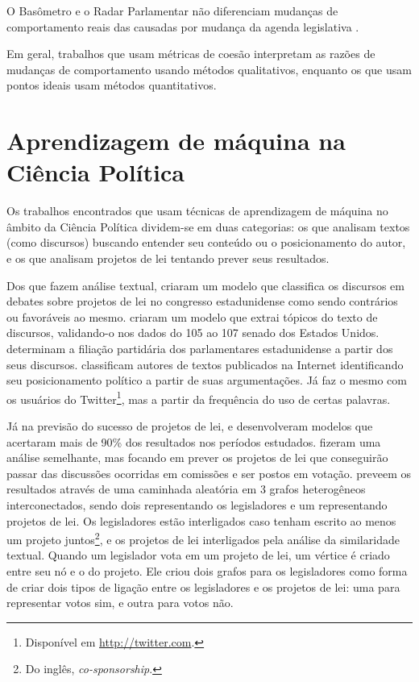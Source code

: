 O Basômetro e o Radar Parlamentar não diferenciam mudanças de comportamento
reais das causadas por mudança da agenda legislativa
\cite{Estadao2012,Trento2013}.

Em geral, trabalhos que usam métricas de coesão interpretam as razões de
mudanças de comportamento usando métodos qualitativos, enquanto os que usam
pontos ideais usam métodos quantitativos.

\section{Aprendizagem de máquina na Ciência Política}
\label{ref:trabalhos-relacionados:data-science-polsci}

Os trabalhos encontrados que usam técnicas de aprendizagem de máquina no
âmbito da Ciência Política dividem-se em duas categorias: os que analisam
textos (como discursos) buscando entender seu conteúdo ou o posicionamento do
autor, e os que analisam projetos de lei tentando prever seus resultados.

Dos que fazem análise textual,  criaram um modelo que
classifica os discursos em debates sobre projetos de lei no congresso
estadunidense como sendo contrários ou favoráveis ao mesmo.
 criaram um modelo que extrai tópicos do texto de
discursos, validando-o nos dados do 105\textordmasculine{} ao
107\textordmasculine{} senado dos Estados Unidos. 
determinam a filiação partidária dos parlamentares estadunidense a partir dos
seus discursos.  classificam autores de textos
publicados na Internet identificando seu posicionamento político a partir de
suas argumentações. Já  faz o mesmo com os usuários do
Twitter\footnote{Disponível em \url{http://twitter.com}.}, mas a partir da
frequência do uso de certas palavras.

Já na previsão do sucesso de projetos de lei,  e
 desenvolveram modelos que acertaram mais de 90\% dos
resultados nos períodos estudados.  fizeram uma análise
semelhante, mas focando em prever os projetos de lei que conseguirão passar das
discussões ocorridas em comissões e ser postos em votação.
 preveem os resultados através de uma caminhada aleatória
em 3 grafos heterogêneos interconectados, sendo dois representando os
legisladores e um representando projetos de lei. Os legisladores estão
interligados caso tenham escrito ao menos um projeto juntos\footnote{Do inglês,
\emph{co-sponsorship}.}, e os projetos de lei interligados pela análise da
similaridade textual. Quando um legislador vota em um projeto de lei, um
vértice é criado entre seu nó e o do projeto. Ele criou dois grafos para os
legisladores como forma de criar dois tipos de ligação entre os legisladores e
os projetos de lei: uma para representar votos sim, e outra para votos não.

